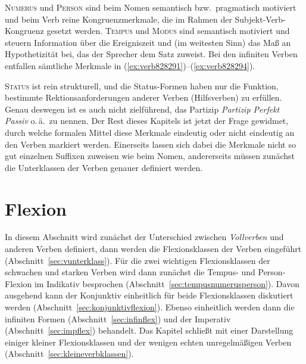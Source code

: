 \begin{exe}
\end{exe}

\textsc{Numerus} und \textsc{Person} sind beim Nomen semantisch bzw.\ pragmatisch motiviert und beim Verb reine Kongruenzmerkmale, die im Rahmen der Subjekt-Verb-Kongruenz gesetzt werden.
\textsc{Tempus} und \textsc{Modus} sind semantisch motiviert und steuern Information über die Ereigniszeit und (im weitesten Sinn) das Maß an Hypothetizität bei, das der Sprecher dem Satz zuweist.
Bei den infiniten Verben entfallen sämtliche Merkmale in (\ref{ex:verb828291})--(\ref{ex:verb828294}).

\begin{exe}
\end{exe}

\textsc{Status} ist rein strukturell, und die Status-Formen haben nur die Funktion, bestimmte Rektionsanforderungen anderer Verben (\zB Hilfsverben) zu erfüllen.
Genau deswegen ist es auch nicht zielführend, das Partizip \textit{Partizip Perfekt Passiv} o.\,ä.\ zu nennen.
Der Rest dieses Kapitels ist jetzt der Frage gewidmet, durch welche formalen Mittel diese Merkmale eindeutig oder nicht eindeutig an den Verben markiert werden.
Einerseits lassen sich dabei die Merkmale nicht so gut einzelnen Suffixen zuweisen wie beim Nomen, andererseits müssen zunächst die Unterklassen der Verben genauer definiert werden.

\section{Flexion}

\label{sec:vvflex}

In diesem Abschnitt wird zunächst der Unterschied zwischen \textit{Vollverben} und anderen Verben definiert, dann werden die Flexionsklassen der Verben eingeführt (Abschnitt~\ref{sec:vunterklass}).
Für die zwei wichtigen Flexionsklassen der schwachen und starken Verben wird dann zunächst die Tempus- und Person-Flexion im Indikativ besprochen (Abschnitt~\ref{sec:tempusnumerusperson}).
Davon ausgehend kann der Konjunktiv einheitlich für beide Flexionsklassen diskutiert werden (Abschnitt~\ref{sec:konjunktivflexion}).
Ebenso einheitlich werden dann die infiniten Formen (Abschnitt~\ref{sec:infinflex}) und der Imperativ (Abschnitt~\ref{sec:impflex}) behandelt.
Das Kapitel schließt mit einer Darstellung einiger kleiner Flexionsklassen und der wenigen echten unregelmäßigen Verben (Abschnitt~\ref{sec:kleineverbklassen}).

